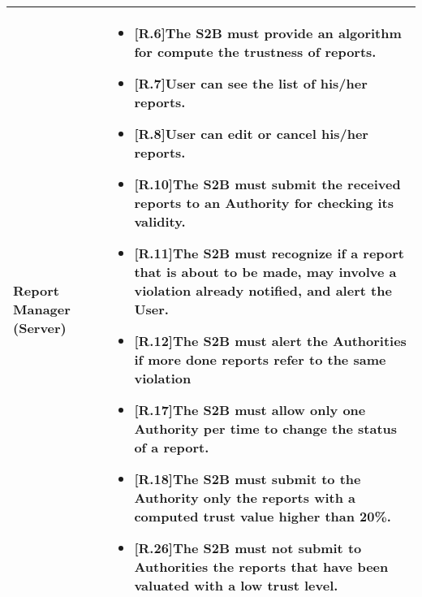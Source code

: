 \begin{table}[H]
\begin{tabular}{|l|p{}|}
\textbf{Report Manager (Server)}     &   \begin{itemize}
    \item \textbf{[R.6]}The S2B must provide an algorithm \newline for compute the trustness of reports.
    \item \textbf{[R.7]}User can see the list of his/her reports.
    \item \textbf{[R.8]}User can edit or cancel his/her reports.
    \item \textbf{[R.10]}The S2B must submit the received \newline reports to an Authority for checking its validity.
    \item \textbf{[R.11]}The S2B must recognize if a report \newline that is about to be made, may involve a  \newline violation already notified,  and alert the User.
    \item \textbf{[R.12]}The S2B must alert the Authorities \newline if more done reports refer to the same violation
    \item \textbf{[R.17]}The S2B must allow only one Authority \newline  per time to change the status of a report.
    \item\textbf{[R.18]}The S2B must submit to the Authority \newline only the reports with a computed trust value \newline higher than 20\%.
    \item \textbf{[R.26]}The S2B must not submit to Authorities the reports that have been valuated with a low trust level.
\end{itemize}\\ \hline

\end{tabular}
\end{table}


